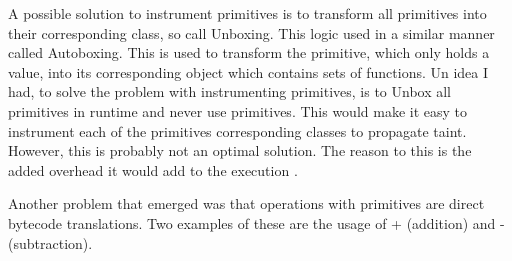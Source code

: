 A possible solution to instrument primitives is to transform all primitives into their corresponding class, so call Unboxing. This logic used in a similar manner called Autoboxing. This is used to transform the primitive, which only holds a value, into its corresponding object which contains sets of functions. Un idea I had, to solve the problem with instrumenting primitives, is to Unbox all primitives in runtime and never use primitives. This would make it easy to instrument each of the primitives corresponding classes to propagate taint. However, this is probably not an optimal solution. The reason to this is the added overhead it would add to the execution \parencite{BlochJoshua2008EJ}. 

Another problem that emerged was that operations with primitives are direct bytecode translations. Two examples of these are the usage of + (addition) and - (subtraction).

